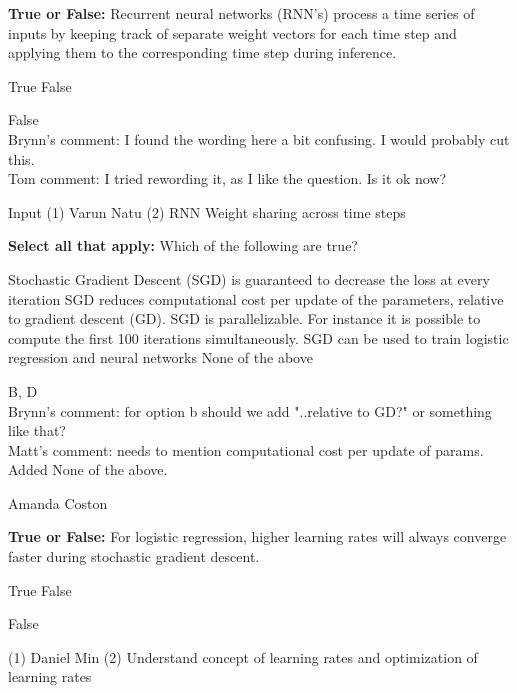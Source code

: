 
\begin{questions}

\question[1] \textbf{True or False:} Recurrent neural networks (RNN's) process a time series of inputs by keeping track of separate weight vectors for each time step and applying them to the corresponding time step during inference.
    \begin{checkboxes}
     \choice True 
     \choice False
    \end{checkboxes}
    \begin{soln}
    False\\
    
    Brynn's comment: I found the wording here a bit confusing. I would probably cut this.  \\ Tom comment: I tried rewording it, as I like the question.  Is it ok now?
    \end{soln}
    \begin{qauthor}
    Input (1) Varun Natu (2) RNN Weight sharing across time steps
    \end{qauthor}
       
      
\question[1] \textbf{Select all that apply:}  Which of the following are true?
{%
    \checkboxchar{$\Box$} %
    \begin{checkboxes}
     \choice Stochastic Gradient Descent (SGD) is guaranteed to decrease the loss at every iteration
     \choice SGD reduces computational cost per update of the parameters, relative to gradient descent (GD).
     \choice SGD is parallelizable. For instance it is possible to compute the first 100 iterations simultaneously.
     \choice SGD can be used to train logistic regression and neural networks
     \choice None of the above
    \end{checkboxes}
    }
    \begin{soln}
    B, D\\
    
    Brynn's comment: for option b should we add "..relative to GD?" or something like that? \\ Matt's comment: needs to mention computational cost per update of params. Added None of the above.
    \end{soln}
    \begin{qauthor}
    Amanda Coston
    \end{qauthor}
    
    
\question[1] \textbf{True or False:} For logistic regression, higher learning rates will always converge faster during stochastic gradient descent.
    \begin{checkboxes}
     \choice True 
     \choice False
    \end{checkboxes}
    \begin{soln}
    False
    \end{soln}
    \begin{qauthor}
    (1) Daniel Min (2) Understand concept of learning rates and optimization of learning rates
    \end{qauthor}



\end{questions}
